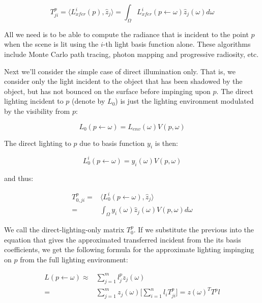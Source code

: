 \begin{equation*}
	T^{p}_{ji}=\langle L^{i}_{xfer}(p),\hat{z}_j\rangle =\int_\Omega L^{i}_{xfer}(p\leftarrow\omega)\hat{z}_j(\omega)d\omega
\end{equation*}

All we need is to be able to compute the radiance that is incident to the point $p$ when the scene is lit using the $i$-th light basis function alone. These algorithms include Monte Carlo path tracing, photon mapping and progressive radiosity, etc. 

Next we'll consider the simple case of direct illumination only. That is, we consider only the light incident to the object that has been shadowed by the object, but has not bounced on the surface before impinging upon $p$. The direct lighting incident to $p$ (denote by $L_0$) is just the lighting environment modulated by the visibility from $p$:

\begin{equation*}
	L_0(p\leftarrow\omega)=L_{env}(\omega)V(p,\omega)
\end{equation*}

The direct lighting to $p$ due to basis function $y_i$ is then:

\begin{equation*}
	L^{i}_0(p\leftarrow\omega)=y_i(\omega)V(p,\omega)
\end{equation*}

and thus:

\begin{equation*}
\begin{aligned}
	T^{p}_{0,ji}=&\langle L^{i}_0(p\leftarrow\omega),\hat{z}_j\rangle \\
	=&\int_\Omega y_i(\omega)\hat{z}_j(\omega)V(p,\omega)d\omega
\end{aligned}
\end{equation*}

We call the direct-lighting-only matrix $T^{p}_0$. If we substitute the previous into the equation that gives the approximated transferred incident from the its basis coefficients, we get the following formula for the approximate lighting impinging on $p$ from the full lighting environment:

\begin{equation*}
\begin{aligned}
	L(p\leftarrow\omega)\approx &\sum^{m}_{j=1}l^{p}_{j}z_j(\omega)\\
	=&\sum^{m}_{j=1}z_j(\omega)\Biggr[ \sum^{n}_{i=1}l_iT^{p}_{ji}  \Biggr]
	=z(\omega)^{T}T^{p}l
\end{aligned}
\end{equation*} 

